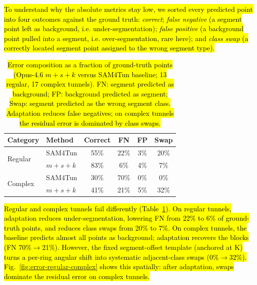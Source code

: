 \documentclass[a4paper,fleqn]{cas-dc}
\begin{document}
{\hl{To understand why the absolute metrics stay low, we sorted every predicted point into four outcomes against the ground truth: \textit{correct}; \textit{false negative} (a segment point left as background, i.e. under-segmentation); \textit{false positive} (a background point pulled into a segment, i.e. over-segmentation, rare here); and \textit{class swap} (a correctly located segment point assigned to the wrong segment type).}

\begin{table}[ht]
\caption{\hl{Error composition as a fraction of ground-truth points (Opus-4.6 \mbox{$m+s+k$} versus SAM4Tun baseline; 13 regular, 17 complex tunnels). FN: segment predicted as background; FP: background predicted as segment; Swap: segment predicted as the wrong segment class. Adaptation reduces false negatives; on complex tunnels the residual error is dominated by class swaps.}}\label{tab:error-composition}
\begin{tabular*}{\tblwidth}{@{} l l c c c c @{}}
\toprule
Category & Method & Correct & FN & FP & Swap \\
\midrule
\multirow{2}{*}{Regular}
  & SAM4Tun       & 55\% & 22\% & 3\% & 20\% \\
  & \mbox{$m+s+k$} & 83\% & 6\%  & 4\% & 7\%  \\
\midrule
\multirow{2}{*}{Complex}
  & SAM4Tun       & 30\% & 70\% & 0\% & 0\%  \\
  & \mbox{$m+s+k$} & 41\% & 21\%  & 5\% & 32\% \\
\bottomrule
\end{tabular*}
\end{table}

\hl{Regular and complex tunnels fail differently (Table~\ref{tab:error-composition}). On regular tunnels, adaptation reduces under-segmentation, lowering FN from 22\% to 6\% of ground-truth points, and reduces class swaps from 20\% to 7\%. On complex tunnels, the baseline predicts almost all points as background; adaptation recovers the blocks (FN 70\%$\rightarrow$21\%). However, the fixed segment-offset template (anchored at K) turns a per-ring angular shift into systematic adjacent-class swaps (0\%$\rightarrow$32\%). Fig.~\ref{fig:error-regular-complex} shows this spatially: after adaptation, swaps dominate the residual error on complex tunnels.}

}
\end{document}

